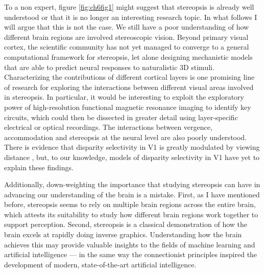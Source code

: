 To a non expert, figure \ref{fig:ch6fig1} might suggest that stereopsis is already well understood or that it is no longer an interesting research topic. In what follows I will argue that this is not the case. We still have a poor understanding of how different brain regions are involved stereoscopic vision. Beyond primary visual cortex, the scientific community has not yet managed to converge to a general computational framework for stereopsis, let alone designing mechanistic models that are able to predict neural responses to naturalistic 3D stimuli. Characterizing the contributions of different cortical layers is one promising line of research for exploring the interactions between different visual areas involved in stereopsis. In particular, it would be interesting to exploit the exploratory power of high-resolution functional magnetic resonance imaging to identify key circuits, which could then be dissected in greater detail using layer-specific electrical or optical recordings. The interactions between vergence, accommodation and stereopsis at the neural level are also poorly understood. There is evidence that disparity selectivity in V1 is greatly modulated by viewing distance \cite{Trotter:1992ij}, but, to our knowledge, models of disparity selectivity in V1 have yet to explain these findings.

Additionally, down-weighting the importance that studying stereopsis can have in advancing our understanding of the brain is a mistake. First, as I have mentioned before, stereopsis seems to rely on multiple brain regions across the entire brain, which attests its suitability to study how different brain regions work together to support perception. Second, stereopsis is a classical demonstration of how the brain excels at rapidly doing inverse graphics. Understanding how the brain achieves this may provide valuable insights to the fields of machine learning and artificial intelligence --- in the same way the connectionist principles inspired the development of modern, state-of-the-art artificial intelligence.




